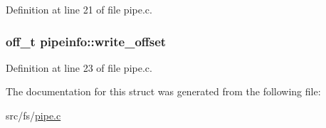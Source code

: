 Definition at line 21 of file pipe.\+c.

\hypertarget{structpipeinfo_abb510c9ed7b4d0bc60432bcc04e3962b}{
\subsubsection[{write\+\_\+offset}]{\setlength{\rightskip}{0pt plus 5cm}off\+\_\+t pipeinfo\+::write\+\_\+offset}}\label{structpipeinfo_abb510c9ed7b4d0bc60432bcc04e3962b}


Definition at line 23 of file pipe.\+c.



The documentation for this struct was generated from the following file\+:\begin{DoxyCompactItemize}
\item 
src/fs/\hyperlink{pipe_8c}{pipe.\+c}\end{DoxyCompactItemize}
